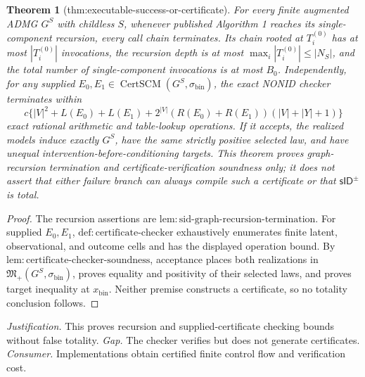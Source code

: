 \documentclass{article}
\newtheorem{theorem}{Theorem}
\begin{document}
\begin{theorem}[thm:executable-success-or-certificate]\label{thm:executable-success-or-certificate}
For every finite augmented ADMG \(G^S\) with childless \(S\), whenever published Algorithm 1 reaches its single-component recursion, every call chain terminates. Its chain rooted at \(T_i^{(0)}\) has at most \(|T_i^{(0)}|\) invocations, the recursion depth is at most \(\max_i|T_i^{(0)}|\le|N_S|\), and the total number of single-component invocations is at most \(B_0\). Independently, for any supplied \(E_0,E_1\in\operatorname{CertSCM}(G^S,\sigma_{\mathrm{bin}})\), the exact NONID checker terminates within
\[
 c\{|V|^2+L(E_0)+L(E_1)+2^{|V|}(R(E_0)+R(E_1))(|V|+|Y|+1)\}
\]
exact rational arithmetic and table-lookup operations. If it accepts, the realized models induce exactly \(G^S\), have the same strictly positive selected law, and have unequal intervention-before-conditioning targets. This theorem proves graph-recursion termination and certificate-verification soundness only; it does not assert that either failure branch can always compile such a certificate or that \(\mathsf{sID}^{\pm}\) is total.
\end{theorem}
\begin{proof}
The recursion assertions are \(\mathrm{lem:sid\text{-}graph\text{-}recursion\text{-}termination}\). For supplied \(E_0,E_1\), \(\mathrm{def:certificate\text{-}checker}\) exhaustively enumerates finite latent, observational, and outcome cells and has the displayed operation bound. By \(\mathrm{lem:certificate\text{-}checker\text{-}soundness}\), acceptance places both realizations in \(\mathfrak M_+(G^S,\sigma_{\mathrm{bin}})\), proves equality and positivity of their selected laws, and proves target inequality at \(x_{\mathrm{bin}}\). Neither premise constructs a certificate, so no totality conclusion follows.
\end{proof}
\par\smallskip\noindent \textit{Justification.} This proves recursion and supplied-certificate checking bounds without false totality. \textit{Gap.} The checker verifies but does not generate certificates. \textit{Consumer.} Implementations obtain certified finite control flow and verification cost.
\end{document}
